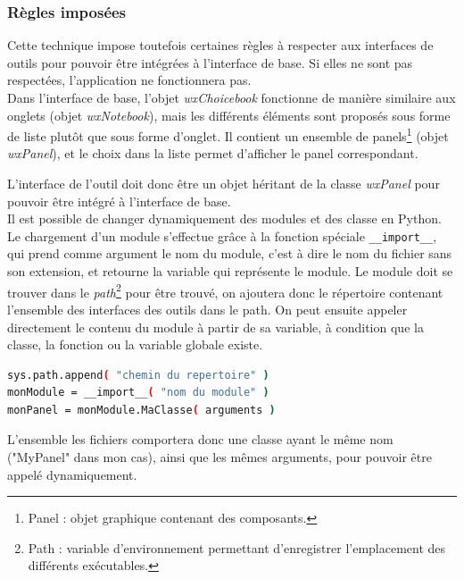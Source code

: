 
\subsubsection{Règles imposées}

Cette technique impose toutefois certaines règles à respecter aux interfaces de outils pour pouvoir être intégrées à l'interface de base.
Si elles ne sont pas respectées, l'application ne fonctionnera pas.
\\


Dans l'interface de base, l'objet \textit{wxChoicebook} fonctionne de manière similaire aux onglets (objet \textit{wxNotebook}), mais les différents éléments sont proposés sous forme de liste plutôt que sous forme d'onglet.
Il contient un ensemble de panels\footnote{Panel : objet graphique contenant des composants.} (objet \textit{wxPanel}), et le choix dans la liste permet d'afficher le panel correspondant.

L'interface de l'outil doit donc être un objet héritant de la classe \textit{wxPanel} pour pouvoir être intégré à l'interface de base.
\\


Il est possible de changer dynamiquement des modules et des classe en Python.
Le chargement d'un module s'effectue grâce à la fonction spéciale \lstinline{__import__}, qui prend comme argument le nom du module, c'est à dire le nom du fichier sans son extension, et retourne la variable qui représente le module.
Le module doit se trouver dans le \textit{path}\footnote{Path : variable d'environnement permettant d'enregistrer l'emplacement des différents exécutables.} pour être trouvé, on ajoutera donc le répertoire contenant l'ensemble des interfaces des outils dans le path.
On peut ensuite appeler directement le contenu du module à partir de sa variable, à condition que la classe, la fonction ou la variable globale existe.
\begin{lstlisting}[language = sh]
sys.path.append( "chemin du repertoire" )
monModule = __import__( "nom du module" )
monPanel = monModule.MaClasse( arguments )
\end{lstlisting}

L'ensemble les fichiers comportera donc une classe ayant le même nom ("MyPanel" dans mon cas), ainsi que les mêmes arguments, pour pouvoir être appelé dynamiquement.
\\





